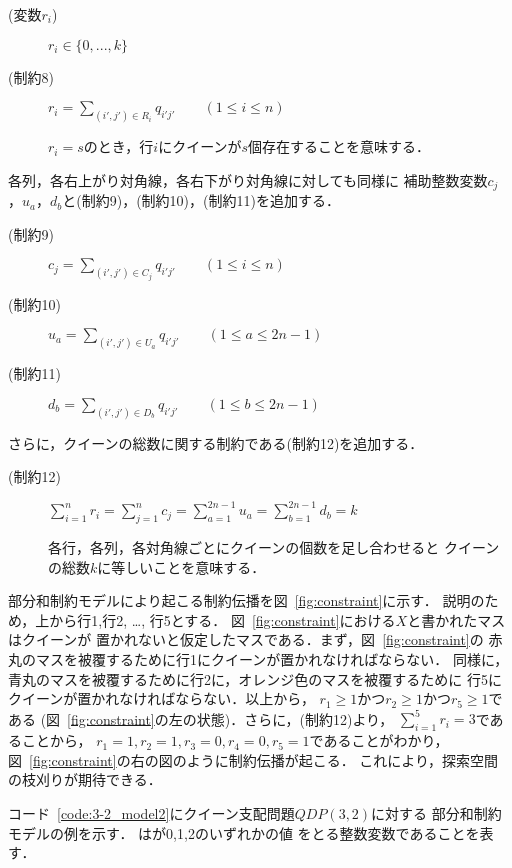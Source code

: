 \begin{description}
 \item[(変数$r_i$)] $r_{i} \in \{0,...,k\}$ 
 \item[(制約8)] $r_{i} = \sum\limits _{(i',j') \in R_{i}} q_{i'j'} \qquad (1 \leq i \leq n)$ \par
$r_i = s$のとき，行$i$にクイーンが$s$個存在することを意味する．
\end{description}
%
各列，各右上がり対角線，各右下がり対角線に対しても同様に
補助整数変数$c_j$，$u_{a}$，$d_{b}$と(制約9)，(制約10)，(制約11)を追加する．
%
\begin{description}
 \item[(制約9)] $c_{j} = \sum\limits _{(i',j') \in C_{j}} 
q_{i'j'} \qquad (1 \leq i \leq n)$
 \item[(制約10)] $u_{a} = \sum\limits _{(i',j') \in U_{a}} 
q_{i'j'}\qquad (1 \leq a \leq 2n-1)$
 \item[(制約11)] $d_{b} = \sum\limits _{(i',j') \in D_{b}} 
q_{i'j'} \qquad(1 \leq b \leq 2n-1)$
\end{description}
さらに，クイーンの総数に関する制約である(制約12)を追加する．
\begin{description}
 \item[(制約12)] $\sum\limits_{i=1}^{n} 
r_{i} = \sum\limits_{j=1}^{n} 
c_{j} =\sum\limits_{a=1}^{2n-1} 
u_{a} =\sum\limits_{b=1}^{2n-1} 
d_{b} = k$ \par
各行，各列，各対角線ごとにクイーンの個数を足し合わせると
クイーンの総数$k$に等しいことを意味する．
\end{description}

部分和制約モデルにより起こる制約伝播を図~\ref{fig:constraint}に示す．
説明のため，上から行1,行2, \dots , 行5とする．
図~\ref{fig:constraint}における$X$と書かれたマスはクイーンが
置かれないと仮定したマスである．まず，図~\ref{fig:constraint}の
赤丸のマスを被覆するために行1にクイーンが置かれなければならない．
同様に，青丸のマスを被覆するために行2に，オレンジ色のマスを被覆するために
行5にクイーンが置かれなければならない．以上から，
$r_1 \geq 1$かつ$r_2 \geq 1$かつ$r_5 \geq 1$である
(図~\ref{fig:constraint}の左の状態)．さらに，(制約12)より，
$\sum\limits _{i=1}^{5} r_i = 3$であることから，
$r_1 = 1,r_2=1,r_3=0,r_4=0,r_5=1$であることがわかり，
図~\ref{fig:constraint}の右の図のように制約伝播が起こる．
これにより，探索空間の枝刈りが期待できる．


コード~\ref{code:3-2_model2}にクイーン支配問題$QDP(3,2)$に対する
部分和制約モデルの例を示す．
  はが0,1,2のいずれかの値
をとる整数変数であることを表す．



